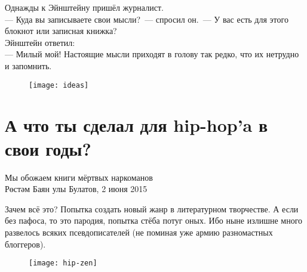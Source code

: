 \vfill

\newpage

\begin{epigraph}
Однажды к Эйнштейну пришёл журналист.\\
--- Куда вы записываете свои мысли?~--- спросил он.~--- У вас есть для этого блокнот или записная книжка?\\

Эйнштейн ответил:\\
--- Милый мой! Настоящие мысли приходят в голову так редко, что их нетрудно и запомнить.
\end{epigraph}

\begin{figure}[ht!]
    \centering
    \texttt{[image: ideas]}
\end{figure}

\newpage

\section*{А что ты сделал для hip-hop'a в свои годы?}\label{section:one}
\begin{epigraph}
        Мы обожаем книги мёртвых наркоманов\\
        {\normalfont Рөстәм Баян улы Булатов, 2 июня 2015}
\end{epigraph}
Зачем всё это? Попытка создать новый жанр в литературном творчестве.
А если без пафоса, то это пародия, попытка стёба потуг оных. Ибо ныне излишне много развелось всяких псевдописателей (не поминая уже армию разномастных блоггеров).

\begin{figure}[ht!]
    \centering
    \texttt{[image: hip-zen]}
\end{figure}
